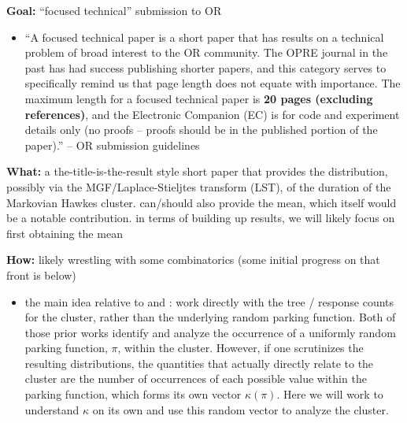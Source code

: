 
\textbf{Goal:} ``focused technical'' submission to OR
\begin{itemize}
\item ``A focused technical paper is a short paper that has results on a technical problem of broad interest to the OR community. The OPRE journal in the past has had success publishing shorter papers, and this category serves to specifically remind us that page length does not equate with importance. The maximum length for a focused technical paper is \textbf{20 pages (excluding references)}, and the Electronic Companion (EC) is for code and experiment details only (no proofs – proofs should be in the published portion of the paper).'' -- OR submission guidelines
\end{itemize}


\textbf{What:} a the-title-is-the-result style \citep[\`a la][]{aldous1987least} short paper that provides the distribution, possibly via the MGF/Laplace-Stieljtes transform (LST), of the duration of the Markovian Hawkes cluster. can/should also provide the mean, which itself would be a notable contribution. in terms of building up results, we will likely focus on first obtaining the mean

\textbf{How:} likely wrestling with some combinatorics (some initial progress on that front is below)
\begin{itemize}
\item the main idea relative to \citet{daw2023conditional} and \citet{daw2026asymmetries}: work directly with the tree / response counts for the cluster, rather than the underlying random parking function. Both of those prior works identify and analyze the occurrence of a uniformly random parking function, $\pi$, within the cluster. However, if one scrutinizes the resulting distributions, the quantities that actually directly relate to the cluster are the number of occurrences of each possible value within the parking function, which forms its own  vector $\kappa(\pi)$. Here we will work to understand $\kappa$ on its own and use this random vector to analyze the cluster.
\end{itemize}


